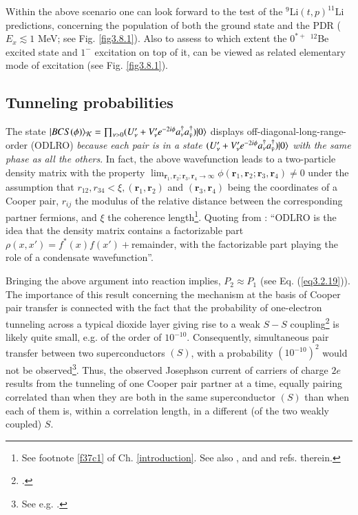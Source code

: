 Within the above scenario one can look forward to the test of the $^9$Li$(t,p)^{11}$Li predictions, concerning the population of both the ground state and the PDR ($E_x\lesssim1$ MeV; see Fig. \ref{fig3.8.1}). Also to assess to which extent the $0^{*+}$ $^{12}$Be excited state and $1^-$ excitation on top of it, can be viewed as related elementary mode of excitation (see Fig. \ref{fig3.8.1}).
 \subsection{Tunneling probabilities}\label{App4.B.3}
 The state $ |{BCS(\phi)} \rangle_{\mathcal K}=\prod_{\nu>0}(U'_\nu+V'_\nu e^{-2i\phi} a_\nu^\dagger a_{\bar{\nu}}^\dagger)|{0} \rangle$  displays off-diagonal-long-range-order (ODLRO) \textit{because each pair is in a state $(U'_\nu+V'_\nu e^{-2i\phi} a_\nu^\dagger a_{\bar{\nu}}^\dagger)|{0} \rangle$ with the same phase as all the others}. In fact, the above wavefunction  leads to a two-particle density matrix with the property $\lim_{\mathbf r_1, \mathbf r_2;\mathbf r_3, \mathbf r_4\rightarrow\infty}\phi(\mathbf r_1, \mathbf r_2;\mathbf r_3, \mathbf r_4)\neq 0$ under the assumption that $r_{12}, r_{34}<\xi, (\mathbf r_1, \mathbf r_2)$ and $(\mathbf r_3, \mathbf r_4)$ being the coordinates of a Cooper pair, $r_{ij}$ the  modulus of the  relative distance between the corresponding partner fermions, and $\xi$ the coherence length\footnote{See footnote \ref{f37c1} of Ch. \ref{introduction}. See also \cite{Ambegaokar:69}, and \cite{Potel:17} and refs. therein.}. Quoting from \cite{Anderson:96}: ``ODLRO 
  is the idea that the density matrix contains a factorizable part $\rho(x,x')=f^*(x)f(x')+$remainder, with the factorizable part playing the role of a condensate wavefunction''.
 
 
 
Bringing the above argument into reaction implies,  $P_2\approx P_1$  (see Eq. (\ref{eq3.2.19})).
 The importance of this result  concerning the mechanism at the basis of Cooper pair transfer is connected with the fact that the probability of one-electron tunneling across a typical dioxide layer giving rise to a weak $S-S$ coupling\footnote{\cite{Pippard:12}.} is likely quite small, e.g.  of the order of $10^{-10}$. Consequently, simultaneous pair transfer between two superconductors $(S)$, with a probability  $(10^{-10})^2$ would not be observed\footnote{See e.g. \cite{McDonald:01}.}. Thus, the observed Josephson current of carriers of charge $2e$ results from the tunneling of one Cooper pair partner at a time, equally pairing correlated than when they are both in the same superconductor $(S)$ than when each of them is, within a correlation length,  in a different (of the two weakly coupled) $S$. 


